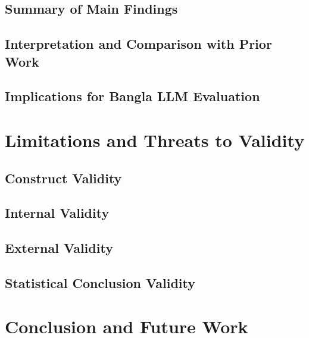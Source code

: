 \documentclass[runningheads]{llncs}
\begin{document}
\subsection{Summary of Main Findings}

\subsection{Interpretation and Comparison with Prior Work}

\subsection{Implications for Bangla LLM Evaluation}

\section{Limitations and Threats to Validity}
\subsection{Construct Validity}

\subsection{Internal Validity}

\subsection{External Validity}

\subsection{Statistical Conclusion Validity}

\section{Conclusion and Future Work}
\end{document}
